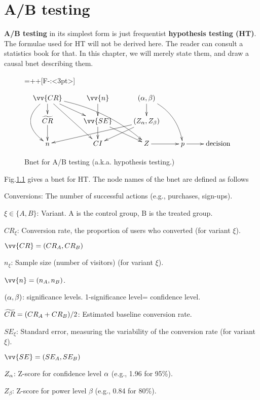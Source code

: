\chapter{A/B testing}
\label{ch-a-b-testing}

{\bf A/B testing} in its simplest
form is just frequentist {\bf hypothesis testing (HT)}.
The formulae used for HT
will not be  derived here. 
 The reader can consult a statistics book  for that.
In this chapter, we will merely state them,
and draw a causal bnet describing them.


\begin{figure}[h!]

{\entrymodifiers={++[F-:<3pt>]}

$$\xymatrix@R=15pt{
\vv{CR}\ar[d]\ar@/_2pc/[dd]
\ar[ddr]
\ar[dr]
\ar@/^1pc/[ddrr]
&\vv{n}\ar[d]
&(\alp, \beta)\ar[d]
\ar@/^1pc/[ddr]
&*{}
&*{}
\\
  \TIL{CR}\ar[d]
&\vv{SE}\ar[d]\ar[dr]
&(Z_\alp, Z_\beta)\ar[dll]
\ar[dl]
&*{}
&*{}
\\
n
&CI
&Z\ar[r]
&p\ar[r]
&\text{decision}
}$$
}
\caption{Bnet for A/B testing (a.k.a. 
hypothesis testing.)}
\label{fig-bnet-hypo-test}
\end{figure}

Fig.\ref{fig-bnet-hypo-test}
gives a bnet for HT. The node names 
of the bnet are defined as follows

Conversions: The number of successful actions (e.g., purchases, sign-ups). 

$\xi\in\{A,B\}$: Variant. A is the control group, B is 
the treated group.

$CR_\xi$: Conversion rate, the proportion of users who converted (for variant $\xi$).

$\vv{CR}=(CR_A, CR_B)$

$n_\xi$: Sample size (number of visitors)
(for variant $\xi$).
   
$\vv{n}=(n_A, n_B)$.

$(\alpha, \beta)$: significance levels. 1-significance level= confidence level.

$  {\widetilde{CR}}= (CR_A + CR_B)/2$: Estimated baseline conversion rate. 


$SE_\xi$: Standard error, measuring the variability of the conversion rate
(for variant $\xi$).
    
$\vv{SE}=(SE_A, SE_B)$

$Z_\alpha$: Z-score for confidence level
 $\alpha$ (e.g., 1.96 for 95\%).  

$Z_\beta$: Z-score for power level $\beta$ (e.g., 0.84 for 80\%).  

